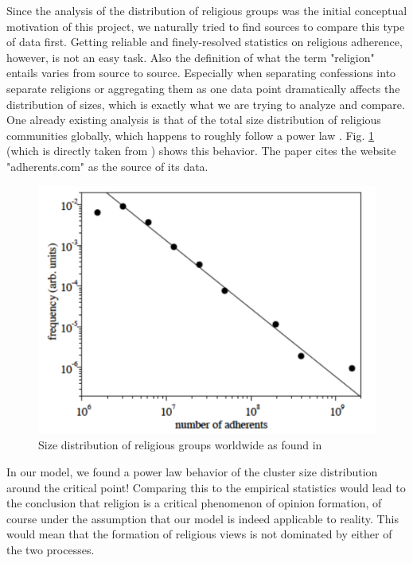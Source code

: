 \documentclass[11pt]{article}
\begin{document}
Since the analysis of the distribution of religious groups was the initial conceptual motivation of this project, we naturally tried to find sources to compare this type of data first. Getting reliable and finely-resolved statistics on religious adherence, however, is not an easy task. Also the definition of what the term "religion" entails varies from source to source. Especially when separating confessions into separate religions or aggregating them as one data point dramatically affects the distribution of sizes, which is exactly what we are trying to analyze and compare. \\

One already existing analysis is that of the total size distribution of religious communities globally, which happens to roughly follow a power law \cite{main paper} \cite{religion power law}. Fig. \ref{Fig:religion_power_law} (which is directly taken from \cite{religion power law}) shows this behavior. The paper cites the website "adherents.com" as the source of its data. \\


\begin{figure}[h!]
  \centering
    \includegraphics[scale=0.6]{Plots/religion_power_law.pdf}
  \caption{Size distribution of religious groups worldwide as found in \cite{religion power law}}
  \label{Fig:religion_power_law}
\end{figure}


In our model, we found a power law behavior of the cluster size distribution around the critical point! Comparing this to the empirical statistics would lead to the conclusion that religion is a critical phenomenon of opinion formation, of course under the assumption that our model is indeed applicable to reality. This would mean that the formation of religious views is not dominated by either of the two processes. \\
\end{document}

